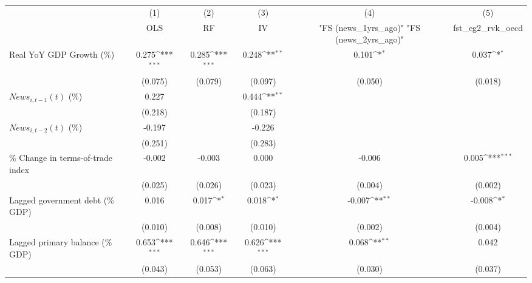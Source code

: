 {
\def\sym#1{\ifmmode^{#1}\else\(^{#1}\)\fi}
\begin{tabular}{l*{5}{c}}
\toprule
                    &\multicolumn{1}{c}{(1)}&\multicolumn{1}{c}{(2)}&\multicolumn{1}{c}{(3)}&\multicolumn{1}{c}{(4)}&\multicolumn{1}{c}{(5)}\\
                    &\multicolumn{1}{c}{OLS}&\multicolumn{1}{c}{RF}&\multicolumn{1}{c}{IV}&\multicolumn{1}{c}{ "FS (news_1yrs_ago)"  "FS (news_2yrs_ago)" }&\multicolumn{1}{c}{fst_eg2_rvk_oecd}\\
\midrule
Real YoY GDP Growth (\%)&       0.275\sym{***}&       0.285\sym{***}&       0.248\sym{**} &       0.101\sym{*}  &       0.037\sym{*}  \\
                    &     (0.075)         &     (0.079)         &     (0.097)         &     (0.050)         &     (0.018)         \\
\addlinespace
$ News_{i,t-1}(t)$ (\%)&       0.227         &                     &       0.444\sym{**} &                     &                     \\
                    &     (0.218)         &                     &     (0.187)         &                     &                     \\
\addlinespace
$ News_{i,t-2}(t)$ (\%)&      -0.197         &                     &      -0.226         &                     &                     \\
                    &     (0.251)         &                     &     (0.283)         &                     &                     \\
\addlinespace
\% Change in terms-of-trade index&      -0.002         &      -0.003         &       0.000         &      -0.006         &       0.005\sym{***}\\
                    &     (0.025)         &     (0.026)         &     (0.023)         &     (0.004)         &     (0.002)         \\
\addlinespace
Lagged government debt (\% GDP)&       0.016         &       0.017\sym{*}  &       0.018\sym{*}  &      -0.007\sym{**} &      -0.008\sym{*}  \\
                    &     (0.010)         &     (0.008)         &     (0.010)         &     (0.002)         &     (0.004)         \\
\addlinespace
Lagged primary balance (\% GDP)&       0.653\sym{***}&       0.646\sym{***}&       0.626\sym{***}&       0.068\sym{**} &       0.042         \\
                    &     (0.043)         &     (0.053)         &     (0.063)         &     (0.030)         &     (0.037)         \\

\end{tabular}}
